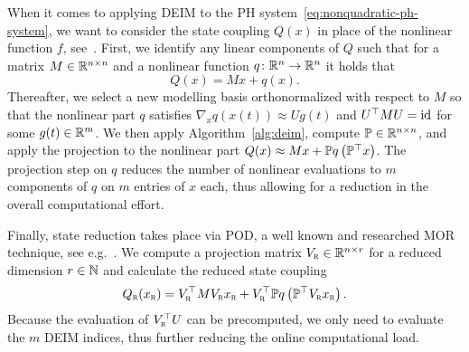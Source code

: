When it comes to applying \ac{DEIM} to the \ac{PH} system~\eqref{eq:nonquadratic-ph-system}, we want to consider the state coupling $Q(x)$ in place of the nonlinear function $f$, see~\cite[Section~3]{Chaturantabut2016}.
First, we identify any linear components of $Q$ such that for a matrix $M \in \mathbb{R}^{n \times n}$ and a nonlinear function $q \colon \mathbb{R}^n \to \mathbb{R}^n$ it holds that
\begin{equation*}
    Q(x) = M x + q(x).
\end{equation*}
Thereafter, we select a new modelling basis orthonormalized with respect to $M$ so that the nonlinear part $q$ satisfies $\nabla_x q(x(t)) \approx U g(t)$ and $U^{\top} M U = \text{id}_{}$ for some $g(t) \in \mathbb{R}^m$.
We then apply Algorithm~\ref{alg:deim}, compute $\mathbb{P} \in \mathbb{R}^{n \times n}$, and apply the projection to the nonlinear part $Q(x) \approx M x + \mathbb{P} q\left( \mathbb{P}^{\top} x \right)$.
The projection step on $q$ reduces the number of nonlinear evaluations to $m$ components of $q$ on $m$ entries of $x$ each, thus allowing for a reduction in the overall computational effort.

Finally, state reduction takes place via \ac{POD}, a well known and researched \ac{MOR} technique, see e.g.~\cite{Pinnau2008}.
We compute a projection matrix $V_{\textnormal{\scshape r}} \in \mathbb{R}^{n \times r}$ for a reduced dimension $r \in \mathbb{N}$ and calculate the reduced state coupling
\begin{equation*}
    Q_{\textnormal{\scshape r}}(x_{\textnormal{\scshape r}}) = V_{\textnormal{\scshape r}}^{\top} M V_{\textnormal{\scshape r}} x_{\textnormal{\scshape r}} + V_{\textnormal{\scshape r}}^{\top}  \mathbb{P} q\left( \mathbb{P}^{\top} V_{\textnormal{\scshape r}} x_{\textnormal{\scshape r}} \right).
\end{equation*}
Because the evaluation of $V_{\textnormal{\scshape r}}^{\top} U$ can be precomputed, we only need to evaluate the $m$ \ac{DEIM} indices, thus further reducing the online computational load.
